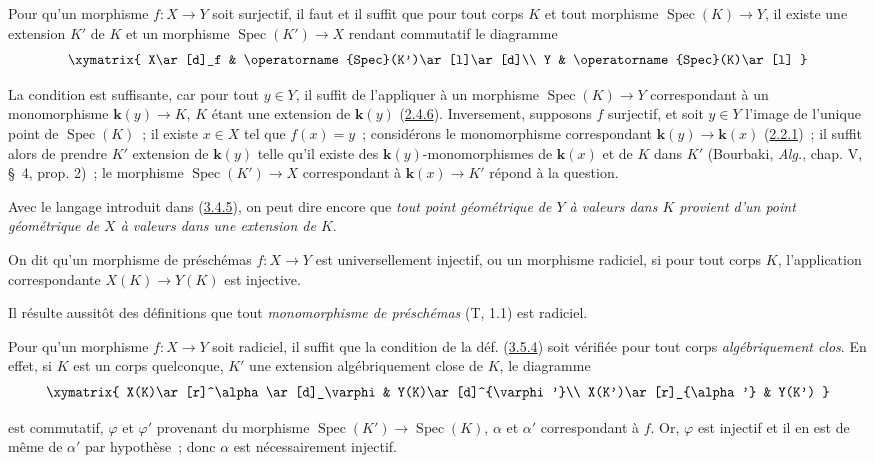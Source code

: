 \begin{proposition}[3.5.3]
\label{I.3.5.3-fr}
Pour qu'un morphisme $f:X\to Y$ soit surjectif, il faut et il suffit que pour
tout corps $K$ et tout morphisme $\operatorname{Spec}(K)\to Y$, il existe une
extension $K'$ de $K$ et un morphisme $\operatorname{Spec}(K')\to X$ rendant
commutatif le diagramme
\label{I.3.5.3.surjectivity-diagram-fr}
\[
  \xymatrix{
    X\ar[d]_f & \operatorname{Spec}(K')\ar[l]\ar[d]\\
    Y & \operatorname{Spec}(K)\ar[l]
  }
\]
\end{proposition}

La condition est suffisante, car pour tout $y\in Y$, il suffit de l'appliquer
à un morphisme $\operatorname{Spec}(K)\to Y$ correspondant à un monomorphisme
$\boldsymbol{k}(y)\to K$, $K$ étant une extension de $\boldsymbol{k}(y)$
(\hyperref[I.2.4.6-fr]{2.4.6}). Inversement, supposons $f$ surjectif, et soit
$y\in Y$ l'image de l'unique point de $\operatorname{Spec}(K)$~; il existe
$x\in X$ tel que $f(x)=y$~; considérons le monomorphisme correspondant
$\boldsymbol{k}(y)\to\boldsymbol{k}(x)$ (\hyperref[I.2.2.1-fr]{2.2.1})~; il suffit alors de prendre
$K'$ extension de $\boldsymbol{k}(y)$ telle qu'il existe des $\boldsymbol{k}(y)$-monomorphismes de
$\boldsymbol{k}(x)$ et de $K$ dans $K'$ (Bourbaki, \emph{Alg.}, chap. V, \S~4, prop. 2)~;
le morphisme $\operatorname{Spec}(K')\to X$ correspondant à $\boldsymbol{k}(x)\to K'$
répond à la question.

Avec le langage introduit dans (\hyperref[I.3.4.5-fr]{3.4.5}), on peut dire
encore que \emph{tout point géométrique de $Y$ à valeurs dans $K$ provient
d'un point géométrique de $X$ à valeurs dans une extension de $K$}.

\begin{definition}[3.5.4]
\label{I.3.5.4-fr}
On dit qu'un morphisme de préschémas $f:X\to Y$ est universellement
injectif, ou un morphisme radiciel, si pour tout corps $K$,
l'application correspondante $X(K)\to Y(K)$ est injective.
\end{definition}

Il résulte aussitôt des définitions que tout \emph{monomorphisme de
préschémas} (T, 1.1) est radiciel.

\begin{env}[3.5.5]
\label{I.3.5.5-fr}
Pour qu'un morphisme $f:X\to Y$ soit radiciel, il suffit que la condition de
la déf. (\hyperref[I.3.5.4-fr]{3.5.4}) soit vérifiée pour tout corps
\emph{algébriquement clos}. En effet, si $K$ est un corps quelconque, $K'$ une
extension algébriquement close de $K$, le diagramme
\label{I.3.5.5.algebraic-closure-diagram-fr}
\[
  \xymatrix{
    X(K)\ar[r]^\alpha\ar[d]_\varphi & Y(K)\ar[d]^{\varphi'}\\
    X(K')\ar[r]_{\alpha'} & Y(K')
  }
\]

est commutatif, $\varphi$ et $\varphi'$ provenant du morphisme
$\operatorname{Spec}(K')\to\operatorname{Spec}(K)$, $\alpha$ et $\alpha'$
correspondant à $f$. Or, $\varphi$ est injectif et il en est de même de
$\alpha'$ par hypothèse~; donc $\alpha$ est nécessairement injectif.
\end{env}

